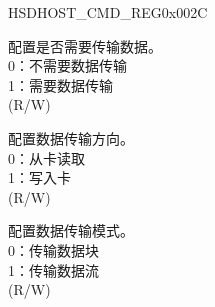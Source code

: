 \begin{register}{H}{SDHOST\_CMD\_REG}{0x002C}
\begin{regdesc}
\begin{reglist}
\label{fielddesc:SDHOSTDATAEXPECTED}\item [SDHOST\_DATA\_EXPECTED] 配置是否需要传输数据。\\0：不需要数据传输\\1：需要数据传输\\(R/W)
\label{fielddesc:SDHOSTREADWRITE}\item [SDHOST\_READ\_WRITE] 配置数据传输方向。\\0：从卡读取\\1：写入卡\\(R/W)
\label{fielddesc:SDHOSTTRANSFERMODE}\item [SDHOST\_TRANSFER\_MODE] 配置数据传输模式。\\0：传输数据块\\1：传输数据流\\(R/W)
\item [见下页...]
\end{reglist}\end{regdesc}
\end{register}

